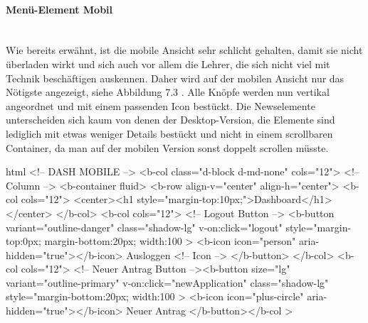 \paragraph{Menü-Element Mobil}
~\\
Wie bereits erwähnt, ist die mobile Ansicht sehr schlicht gehalten, damit sie nicht überladen wirkt und sich auch vor allem die Lehrer, die sich nicht viel mit Technik beschäftigen auskennen. Daher wird auf der mobilen Ansicht nur das Nötigste angezeigt, siehe Abbildung 7.3 . Alle Knöpfe werden nun vertikal angeordnet und mit einem passenden Icon bestückt. Die Newselemente unterscheiden sich kaum von denen der Desktop-Version, die Elemente sind lediglich mit etwas weniger Details bestückt und nicht in einem scrollbaren Container, da man auf der mobilen Version sonst doppelt scrollen müsste.
\begin{code}{html}
	<!-- DASH MOBILE -->
	<b-col class="d-block d-md-none" cols="12">
	  <!-- Column -->
	  <b-container fluid>
		<b-row align-v="center" align-h="center">
		  <b-col cols="12">
			<center><h1 style="margin-top:10px;">Dashboard</h1></center>
		  </b-col>
		  <b-col cols="12">
			<!-- Logout Button -->
			<b-button
			  variant="outline-danger"
			  class="shadow-lg"
			  v-on:click="logout"
			  style="margin-top:0px; margin-bottom:20px; width:100%
			>
			  <b-icon icon="person" aria-hidden="true"></b-icon> Ausloggen
			  <!-- Icon -->
			</b-button>
		  </b-col>
		  <b-col cols="12">
			<!-- Neuer Antrag Button --><b-button
			  size="lg"
			  variant="outline-primary"
			  v-on:click="newApplication"
			  class="shadow-lg"
			  style="margin-bottom:20px; width:100%
			>
			  <b-icon icon="plus-circle" aria-hidden="true"></b-icon> Neuer
			  Antrag
			</b-button></b-col
		  >	
\end{code}
	\label{list:startmobile} ~\\
